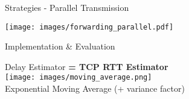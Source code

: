 \begin{frame}[t]{Strategies - Parallel Transmission}
	\begin{center}
	\texttt{[image: images/forwarding\_parallel.pdf]}%
	\end{center}
\end{frame}



\begin{frame}
	\begin{center}
		\vfill
		\LARGE Implementation \& Evaluation
		\vfill
	\end{center}
\end{frame}

%		

\begin{frame}{Delay Estimator}
	\vspace*{-1.7em}
	\textbf{= TCP RTT Estimator}\\[0.8em]
	\texttt{[image: images/moving\_average.png]}\\[0.5em]
	Exponential Moving Average (+ variance factor)\\[0.1em]
\end{frame}

